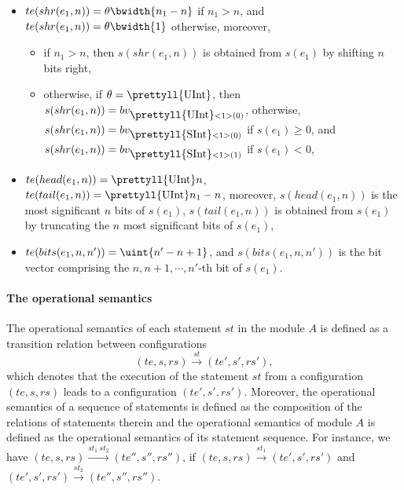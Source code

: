 \begin{itemize}
\begin{itemize}
%
\item $te(shr(e_1, n)) = \theta \bwidth{n_1-n}$ if $n_1 > n$, and $te(shr(e_1, n)) =  \theta \bwidth{1}$ otherwise,  moreover,
\begin{itemize}
\item if $n_1 > n$, then $s(shr(e_1, n))$ is obtained from $s(e_1)$ by shifting $n$ bits right,
%
\item otherwise, if $\theta = \mbox{\prettyll{UInt}}$, then $s(shr(e_1, n))=bv_{\mbox{\prettyll{UInt}}<1>(0)}$, otherwise, $s(shr(e_1, n))=bv_{\mbox{\prettyll{SInt}}<1>(0)}$ if $s(e_1) \ge 0$, and $s(shr(e_1, n))=bv_{\mbox{\prettyll{SInt}}<1>(1)}$ if $s(e_1) < 0$,
\end{itemize}
%
\item $te(head(e_1, n)) = { \mbox{\prettyll{UInt}}}{n}$, $te(tail(e_1, n)) = { \mbox{\prettyll{UInt}}}{n_1-n}$, moreover, $s(head(e_1, n))$ is the most significant $n$ bits of $s(e_1)$, $s(tail(e_1, n))$ is obtained from $s(e_1)$ by truncating the $n$ most significant bits of $s(e_1)$,
%
\item $te(bits(e_1, n, n')) = \uint{n'-n+1}$, and $s(bits(e_1, n, n'))$ is the bit vector comprising the $n, n+1, \cdots, n'$-th bit of $s(e_1)$.
\end{itemize}
%
\end{itemize}

\paragraph*{The operational semantics}
The operational semantics of each statement $st$ in the module $A$ is defined as a transition relation between configurations
$$(te, s, rs) \xrightarrow{st} (te', s', rs'),$$
which denotes that the execution of the statement $st$ from a configuration $(te, s, rs)$ leads to a configuration $(te', s', rs')$.
Moreover, the operational semantics of a sequence of statements is defined as the composition of the relations of statements therein and the operational semantics of module $A$ is defined as the operational semantics of its statement sequence.
For instance, we have $(te, s, rs) \xrightarrow{st_1\ st_2} (te'', s'', rs'')$, if $(te, s, rs) \xrightarrow{st_1} (te', s', rs')$
and  $(te', s', rs') \xrightarrow{st_2} (te'', s'', rs'')$.

